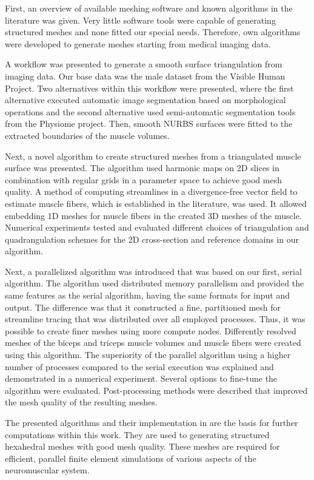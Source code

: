 First, an overview of available meshing software and known algorithms in the literature was given. Very little software tools were capable of generating structured meshes and none fitted our special needs. Therefore, own algorithms were developed to generate meshes starting from medical imaging data.

A workflow was presented to generate a smooth surface triangulation from imaging data. Our base data was the male dataset from the Visible Human Project. Two alternatives within this workflow were presented, where the first alternative executed automatic image segmentation based on morphological operations and the second alternative used semi-automatic segmentation tools from the Physiome project. Then, smooth NURBS surfaces were fitted to the extracted boundaries of the muscle volumes.

Next, a novel algorithm to create structured meshes from a triangulated muscle surface was presented. The algorithm used harmonic maps on 2D slices in combination with regular grids in a parameter space to achieve good mesh quality. A method of computing streamlines in a divergence-free vector field to estimate muscle fibers, which is established in the literature, was used. It allowed embedding 1D meshes for muscle fibers in the created 3D meshes of the muscle. Numerical experiments tested and evaluated different choices of triangulation and quadrangulation schemes for the 2D cross-section and reference domains in our algorithm.

Next, a parallelized algorithm was introduced that was based on our first, serial algorithm. The algorithm used distributed memory parallelism and provided the same features as the serial algorithm, having the same formats for input and output. The difference was that it constructed a fine, partitioned mesh for streamline tracing that was distributed over all employed processes. Thus, it was possible to create finer meshes using more compute nodes. Differently resolved meshes of the biceps and triceps muscle volumes and muscle fibers were created using this algorithm. The superiority of the parallel algorithm using a higher number of processes compared to the serial execution was explained and demonstrated in a numerical experiment. Several options to fine-tune the algorithm were evaluated. Post-processing methods were described that improved the mesh quality of the resulting meshes.

The presented algorithms and their implementation in \opendihu{} are the basis for further computations within this work. They are used to generating structured hexahedral meshes with good mesh quality. These meshes are required for efficient, parallel finite element simulations of various aspects of the neuromuscular system.

